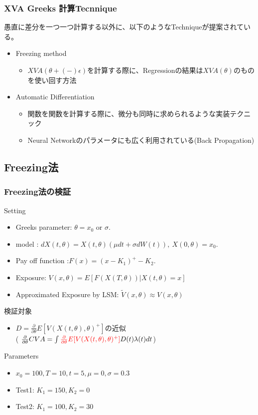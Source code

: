 \documentclass[driverfallback=dvipdfmx,cjk]{beamer}
\begin{document}
\begin{frame}\frametitle{XVA Greeks 計算Tecnnique}
愚直に差分を一つ一つ計算する以外に、以下のようなTechniqueが提案されている。
\begin{itemize}
    \item Freezing method
        \begin{itemize}
            \item $XVA(\theta +(-) \epsilon)$を計算する際に、Regressionの結果は$XVA(\theta)$のものを使い回す方法
        \end{itemize}
    \item Automatic Differentiation
        \begin{itemize}
            \item 関数を関数を計算する際に、微分も同時に求められるような実装テクニック
            \item Neural Networkのパラメータにも広く利用されている(Back Propagation)
        \end{itemize}
\end{itemize}
\end{frame}

\subsection{Freezing法}
\begin{frame}\frametitle{Freezing法の検証 }
    Setting
    \begin{itemize}
        \item Greeks parameter: $\theta = x_0$  or  $\sigma.$
        \item model : $d X(t,\theta) = X(t,\theta) ( \mu dt + \sigma dW(t)), \ X(0,\theta) = x_0.$
        \item Pay off function :$ F(x) = (x - K_1)^+  - K_2. $
        \item Exposure: $ V(x, \theta) = E[F(X(T, \theta)) |X(t, \theta) = x] $
        \item Approximated Exposure by LSM:  $\tilde{V}(x, \theta)\approx V(x, \theta)$
    \end{itemize}
    検証対象
    \begin{itemize}
        \item $D=\frac{\partial}{\partial \theta} E[V(X(t,\theta),\theta)^+] $の近似\\
        ( $\frac{\partial }{\partial \theta} CVA = \int \textcolor{red}{\frac{\partial}{\partial \theta} E[V(X(t,\theta),\theta)^+]} D(t)\lambda(t)dt$)
    \end{itemize}
    Parameters
    \begin{itemize}
        \item $x_0=100, T = 10, t = 5, \mu=0, \sigma=0.3$
        \item Test1: $K_1 = 150, K_2 = 0$
        \item Test2: $K_1 = 100, K_2 = 30$
    \end{itemize}
\end{frame}
\end{document}
